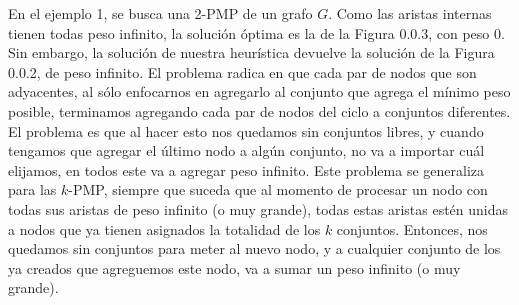 \documentclass[11pt, a4paper, twoside]{article}
\begin{document}
\begin{enumerate}
\begin{enumerate}
		En el ejemplo 1, se busca una 2-PMP de un grafo $G$. Como las aristas internas tienen todas peso
		infinito, la solución óptima es la de la Figura 0.0.3, con peso 0. Sin embargo, la solución de 
		nuestra heurística devuelve la solución de la Figura 0.0.2, de peso infinito. El problema radica en 
		que cada par de nodos que son adyacentes, al sólo enfocarnos en agregarlo al conjunto que agrega el mínimo
		peso posible, terminamos agregando cada par de nodos del ciclo a conjuntos diferentes. El problema es que 
		al hacer esto nos quedamos sin conjuntos libres, y cuando tengamos que agregar el último nodo a algún
		conjunto, no va a importar cuál elijamos, en todos este va a agregar peso infinito. Este problema se
		generaliza para las $k$-PMP, siempre que suceda que al momento de procesar un nodo con todas sus aristas de
		peso infinito (o muy grande), todas estas aristas estén unidas a nodos que ya tienen asignados la totalidad
		de los $k$ conjuntos. Entonces, nos quedamos sin conjuntos para meter al nuevo nodo, y a cualquier conjunto de
		los ya creados que agreguemos este nodo, va a sumar un peso infinito (o muy grande).
		

\end{enumerate}
\end{enumerate}
\end{document}
